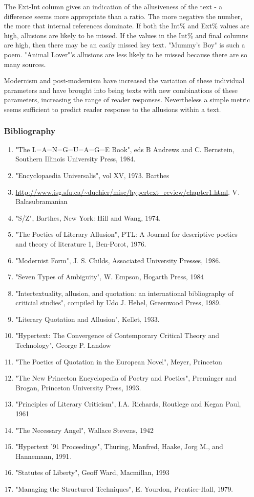\documentclass[11pt]{article}
\begin{document}
The Ext-Int column gives an indication of the allusiveness of the text - a difference seems more appropriate than a ratio. The more negative the number, the more that internal references dominate. If both the Int\% and Ext\% values are high, allusions are likely to be missed. If the values in the Int\% and final columns are high, then there may be an easily missed key text. "Mummy’s Boy" is such a poem. "Animal Lover"’s allusions are less likely to be missed because there are so many sources.

Modernism and post-modernism have increased the variation of these individual parameters and have brought into being texts with new combinations of these parameters, increasing the range of reader responses. Nevertheless a simple metric seems sufficient to predict reader response to the allusions within a text.

\subsubsection*{Bibliography}
\begin{enumerate}
\item "The L=A=N=G=U=A=G=E Book", eds B Andrews and C. Bernstein, Southern Illinois University Press, 1984.
\item "Encyclopaedia Universalis", vol XV, 1973. Barthes
\item \url{http://www.isg.sfu.ca/~duchier/misc/hypertext_review/chapter1.html}, V. Balasubramanian
\item "S/Z", Barthes, New York: Hill and Wang, 1974.
\item "The Poetics of Literary Allusion", PTL: A Journal for descriptive poetics and theory of literature 1, Ben-Porot, 1976.
\item "Modernist Form", J. S. Childs, Associated University Presses, 1986.
\item "Seven Types of Ambiguity", W. Empson, Hogarth Press, 1984
\item "Intertextuality, allusion, and quotation: an international bibliography of criticial studies", compiled by Udo J. Hebel, Greenwood Press, 1989.
\item "Literary Quotation and Allusion", Kellet, 1933.
\item "Hypertext: The Convergence of Contemporary Critical Theory and Technology", George P. Landow
\item "The Poetics of Quotation in the European Novel", Meyer, Princeton
\item "The New Princeton Encyclopedia of Poetry and Poetics", Preminger and Brogan, Princeton University Press, 1993.
\item "Principles of Literary Criticism", I.A. Richards, Routlege and Kegan Paul, 1961
\item "The Necessary Angel", Wallace Stevens, 1942
\item "Hypertext '91 Proceedings", Thuring, Manfred, Haake, Jorg M., and Hannemann, 1991.
\item "Statutes of Liberty", Geoff Ward, Macmillan, 1993
\item "Managing the Structured Techniques", E. Yourdon, Prentice-Hall, 1979.
\end{enumerate}
\end{document}
